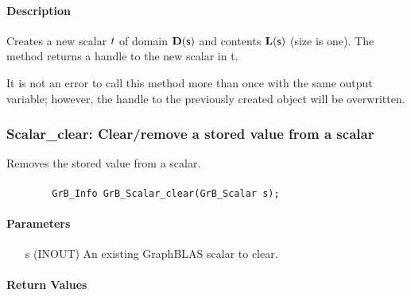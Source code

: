 \paragraph{Description}

Creates a new scalar ${t}$ of domain $\mathbf{D}({\sf s})$ and contents 
$\mathbf{L}({\sf s})$ (size is one). The method returns a handle to the new scalar in {\sf t}.

It is not an error to call this method more than once with the same output variable;  
however, the handle to the previously created object will be overwritten. 


\subsubsection{{\sf Scalar\_clear}: Clear/remove a stored value from a scalar}

Removes the stored value from a scalar.

\paragraph{\syntax}

\begin{verbatim}
        GrB_Info GrB_Scalar_clear(GrB_Scalar s);
\end{verbatim}

\paragraph{Parameters}

\begin{itemize}[leftmargin=1.1in]
    \item[{\sf s}] ({\sf INOUT}) An existing GraphBLAS scalar to clear.
\end{itemize}

\paragraph{Return Values}


